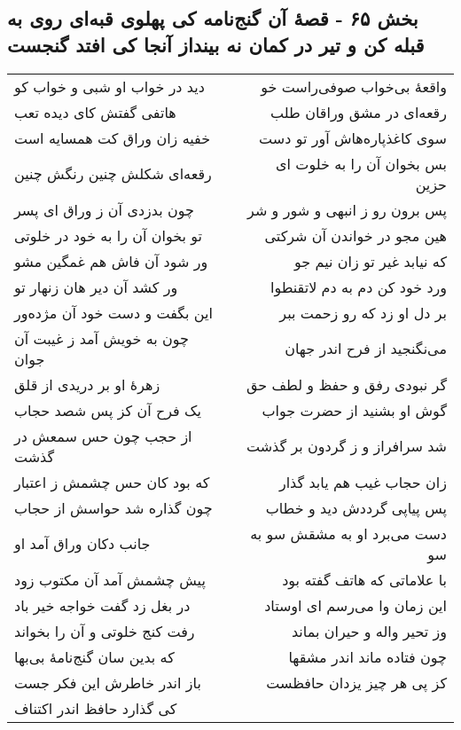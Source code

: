 \begin{center}
\section*{بخش ۶۵ - قصهٔ آن گنج‌نامه کی پهلوی قبه‌ای روی به قبله کن و تیر در کمان نه بینداز آنجا کی افتد گنجست}
\label{sec:sh065}
\begin{longtable}{l p{0.5cm} r}
دید در خواب او شبی و خواب کو
&&
واقعهٔ بی‌خواب صوفی‌راست خو
\\
هاتفی گفتش کای دیده تعب
&&
رقعه‌ای در مشق وراقان طلب
\\
خفیه زان وراق کت همسایه است
&&
سوی کاغذپاره‌هاش آور تو دست
\\
رقعه‌ای شکلش چنین رنگش چنین
&&
بس بخوان آن را به خلوت ای حزین
\\
چون بدزدی آن ز وراق ای پسر
&&
پس برون رو ز انبهی و شور و شر
\\
تو بخوان آن را به خود در خلوتی
&&
هین مجو در خواندن آن شرکتی
\\
ور شود آن فاش هم غمگین مشو
&&
که نیابد غیر تو زان نیم جو
\\
ور کشد آن دیر هان زنهار تو
&&
ورد خود کن دم به دم لاتقنطوا
\\
این بگفت و دست خود آن مژده‌ور
&&
بر دل او زد که رو زحمت ببر
\\
چون به خویش آمد ز غیبت آن جوان
&&
می‌نگنجید از فرح اندر جهان
\\
زهرهٔ او بر دریدی از قلق
&&
گر نبودی رفق و حفظ و لطف حق
\\
یک فرح آن کز پس شصد حجاب
&&
گوش او بشنید از حضرت جواب
\\
از حجب چون حس سمعش در گذشت
&&
شد سرافراز و ز گردون بر گذشت
\\
که بود کان حس چشمش ز اعتبار
&&
زان حجاب غیب هم یابد گذار
\\
چون گذاره شد حواسش از حجاب
&&
پس پیاپی گرددش دید و خطاب
\\
جانب دکان وراق آمد او
&&
دست می‌برد او به مشقش سو به سو
\\
پیش چشمش آمد آن مکتوب زود
&&
با علاماتی که هاتف گفته بود
\\
در بغل زد گفت خواجه خیر باد
&&
این زمان وا می‌رسم ای اوستاد
\\
رفت کنج خلوتی و آن را بخواند
&&
وز تحیر واله و حیران بماند
\\
که بدین سان گنج‌نامهٔ بی‌بها
&&
چون فتاده ماند اندر مشقها
\\
باز اندر خاطرش این فکر جست
&&
کز پی هر چیز یزدان حافظست
\\
کی گذارد حافظ اندر اکتناف

\end{longtable}
\end{center}
